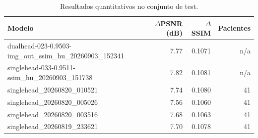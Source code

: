 \begin{table}[htbp]
\centering
\caption[Quantitative test-set results]{Resultados quantitativos no conjunto de test.}
\label{tab:workflow-internal-metrics}
\begin{tabular}{lrrr}
\hline
Modelo & $\Delta$PSNR (dB) & $\Delta$SSIM & Pacientes \\
\hline
dualhead-023-0.9503-img\_out\_ssim\_hu\_20260903\_152341 & 7.77 & 0.1071 & n/a \\
singlehead-033-0.9511-ssim\_hu\_20260903\_151738 & 7.82 & 0.1081 & n/a \\
singlehead\_20260820\_010521 & 7.74 & 0.1080 & 41 \\
singlehead\_20260820\_005026 & 7.56 & 0.1060 & 41 \\
singlehead\_20260820\_003516 & 7.68 & 0.1063 & 41 \\
singlehead\_20260819\_233621 & 7.70 & 0.1078 & 41 \\
\hline
\end{tabular}
\end{table}
